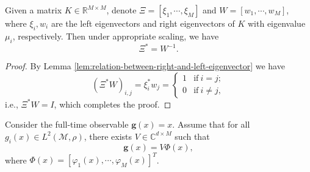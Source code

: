 \begin{proposition}
  Given a matrix $K \in \mathbb{R}^{M \times M}$,
  denote $\Xi = [\xi_1,\cdots,\xi_M]$ and $W = [w_1,\cdots,w_M]$,
  where $\xi_i, w_i$ are the left eigenvectors and right eigenvectors
  of $K$ with eigenvalue $\mu_i$, respectively.
  Then under appropriate scaling, we have
  \begin{equation}
    \label{eq:relation-between-right-and-left-eigenvector-matrix}
    \Xi^{\ast} = W^{-1}.
  \end{equation}
\end{proposition}

\begin{proof}
  By Lemma \ref{lem:relation-between-right-and-left-eigenvector}
  we have
  \begin{equation*}
  (\Xi^{\ast}W)_{i,j} = \xi_i^{\ast} w_j =
  \begin{cases}
    1 & \text{if} ~ i = j;\\
    0 & \text{if} ~ i \neq j,
  \end{cases}
  \end{equation*}
  i.e., $\Xi^{\ast}W = I$, which completes the proof.
\end{proof}

\begin{proposition}
  Consider the full-time observable $\mathbf{g}(x) = x$.
  Assume that for all $g_i(x) \in L^2(\mathcal{M}, \rho)$,
  there exists $V \in \mathbb{C}^{d \times M}$ such that
  \begin{equation*}
    \mathbf{g}(x) = V \Phi(x),
  \end{equation*}
  where $\Phi(x) = [\varphi_1(x),\cdots,\varphi_M(x)]^T$.
\end{proposition}


